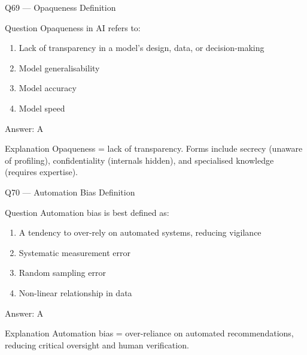 \documentclass[aspectratio=169,8pt]{beamer}
\begin{document}
	\begin{frame}{Q69 --- Opaqueness Definition}
		\begin{block}{Question}
			Opaqueness in AI refers to:
			\begin{enumerate}
				\item Lack of transparency in a model's design, data, or decision-making
				\item Model generalisability
				\item Model accuracy
				\item Model speed
			\end{enumerate}
		\end{block}
		\begin{exampleblock}{Answer: A}\end{exampleblock}
		\begin{block}{Explanation}
			Opaqueness = lack of transparency. Forms include secrecy (unaware of profiling), confidentiality (internals hidden), and specialised knowledge (requires expertise).
		\end{block}
	\end{frame}
	
	\begin{frame}{Q70 --- Automation Bias Definition}
		\begin{block}{Question}
			Automation bias is best defined as:
			\begin{enumerate}
				\item A tendency to over-rely on automated systems, reducing vigilance
				\item Systematic measurement error
				\item Random sampling error
				\item Non-linear relationship in data
			\end{enumerate}
		\end{block}
		\begin{exampleblock}{Answer: A}\end{exampleblock}
		\begin{block}{Explanation}
			Automation bias = over-reliance on automated recommendations, reducing critical oversight and human verification.
		\end{block}
	\end{frame}
	
\end{document}
